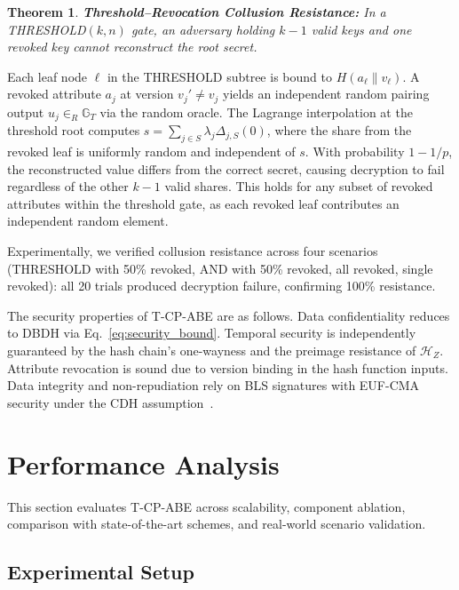 ﻿\documentclass[lettersize,journal]{IEEEtran}
\makeatletter
\renewcommand{\proofname}{\bfseries Proof}
\renewenvironment{proof}[1][\proofname]{\par
  \pushQED{\qed}%
  \normalfont \topsep6\p@\@plus6\p@\relax
  \trivlist
  \item[\hskip\labelsep
        \itshape
  #1\@addpunct{:}]\ignorespaces
}{%
  \popQED\endtrivlist\@endpefalse
}
\newtheorem{theorem}{Theorem}
\makeatother
\begin{document}
\begin{theorem}
\label{thm:collusion}
\textbf{Threshold--Revocation Collusion Resistance:}
In a THRESHOLD$(k,n)$ gate, an adversary holding $k{-}1$ valid keys
and one revoked key cannot reconstruct the root secret.
\end{theorem}

\begin{proof}
Each leaf node $\ell$ in the THRESHOLD subtree is bound to
$H(a_\ell \| v_\ell)$. A revoked attribute $a_j$ at version $v_j' \neq v_j$
yields an independent random pairing output $u_j \in_R \mathbb{G}_T$ via
the random oracle. The Lagrange interpolation at the threshold root
computes $s = \sum_{j \in S} \lambda_j \Delta_{j,S}(0)$, where the share
from the revoked leaf is uniformly random and independent of $s$.
With probability $1 - 1/p$, the reconstructed value differs from the
correct secret, causing decryption to fail regardless of the other
$k{-}1$ valid shares. This holds for any subset of revoked attributes
within the threshold gate, as each revoked leaf contributes an
independent random element.
\end{proof}

Experimentally, we verified collusion resistance across four scenarios
(THRESHOLD with 50\% revoked, AND with 50\% revoked, all revoked, single
revoked): all 20 trials produced decryption failure, confirming 100\%
resistance.

The security properties of T-CP-ABE are as follows.
Data confidentiality reduces to DBDH via Eq.~\eqref{eq:security_bound}.
Temporal security is independently guaranteed by the hash chain's one-wayness
and the preimage resistance of $\mathcal{H}_Z$. Attribute revocation is
sound due to version binding in the hash function inputs. Data integrity
and non-repudiation rely on BLS signatures with EUF-CMA security
under the CDH assumption~\cite{Boneh1998_CDH, Boneh2001_BLS}.

\section{Performance Analysis}
\label{sec:performance}

This section evaluates T-CP-ABE across
scalability, component ablation, comparison with state-of-the-art schemes,
and real-world scenario validation.

\subsection{Experimental Setup}
\label{subsec:setup}
\end{document}
